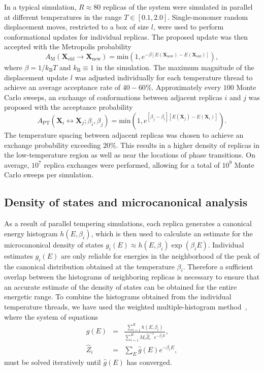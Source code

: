 \documentclass[12pt]{report}
\begin{document}
In a typical simulation, $R \approx 80$ replicas of the system were
simulated in parallel at different temperatures in the range 
$T \in \left[0.1,2.0\right]$.
Single-monomer random displacement moves, restricted to a box of size $l$,
were used to perform conformational updates for individual replicas.
The proposed update was then accepted with the Metropolis probability
\begin{equation}
A_\mathrm{M}\left(\mathbf{X}_{\mathrm{old}} \rightarrow
\mathbf{X}_{\mathrm{new}}\right) = 			
\mathrm{min}\left(1,e^{ -\beta\left[E
(\mathbf{X}_{\mathrm{new}}) -
E(\mathbf{X}_{\mathrm{old}})\right]} \right),
\end{equation}
%
where $\beta = 1/k_{\mathrm{B}}T$ and $k_{\mathrm{B}} \equiv 1$ in the
simulation.
The maximum magnitude of the displacement update $l$ was adjusted
individually
for each temperature thread to achieve an average acceptance rate of
$40-60\%$.
Approximately every $100$ Monte Carlo sweeps, an exchange of conformations 
between adjacent replicas $i$ and $j$ was proposed with the acceptance
probability
\begin{equation}
A_\mathrm{PT}\left(\mathbf{X}_{i} \leftrightarrow \mathbf{X}_{j};
\beta _{i}, \beta_{j} \right) =
\mathrm{min}\left(1,e^{\left[\beta_{j} -
\beta _{i} \right] \left[E (\mathbf{X}_{j}) -
E(\mathbf{X}_{i})\right]} \right).
\end{equation}
%
The temperature spacing between adjacent replicas was chosen to achieve
an exchange probability exceeding $20\%$. This results in a higher density of
replicas in the low-temperature region as well as near the locations of phase
transitions.
On average, $10^7$ replica exchanges were performed, allowing for a total of 
$10^9$ Monte Carlo sweeps per simulation. 
%
\subsection{Density of states and microcanonical analysis}
As a result of parallel tempering simulations, each replica generates 
a canonical energy histogram $h(E,\beta_{i})$,
which is then used to calculate an estimate for the microcanonical density 
of states $g_{i}(E) \approx h(E,\beta_{i})\exp{(\beta _{i} E)}$.
Individual estimates $g_{i}(E)$ are only reliable for energies in the
neighborhood 
of the peak of the canonical distribution obtained at the temperature
$\beta _{i}$.
Therefore a sufficient overlap between the histograms of
neighboring replicas 
is necessary to ensure that an accurate estimate of the density of states 
can be
obtained for the entire energetic range. To combine the histograms obtained
from the individual temperature threads, we have used the weighted
multiple-histogram 
method~\cite{Ferrenberg1989,Kumar1992}, where the system of equations
\begin{eqnarray}
\hat{g}(E)&= &\frac{\sum_{i=1}^{R} h(E,\beta _{i})}{\sum_{i=1}^{R} M_i
\hat{Z}_i^{-1} e^{-\beta_i E}}, \\
\hat{Z}_i &= &\sum_E \hat{g}(E) e^{-\beta_i E},
\end{eqnarray}
%
must be solved iteratively until $\hat{g}(E)$ has converged.
\end{document}
